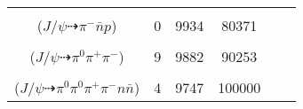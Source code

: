 \documentclass[landscape]{article}
\newcounter{rownumbers}
\newcommand\rn{\stepcounter{rownumbers}\arabic{rownumbers}}
\newcommand{\EOL}{\\} %
\newcommand{\topoTags}[1]{#1} %
\begin{document}
\begin{longtable}{clcccc}
\rn & \makecell[l]{ $ 
J/\psi \rightarrow \pi^{-} \bar{n} p 
$ \\ ($
J/\psi \dashrightarrow \pi^{-} \bar{n} p 
$) } & \topoTags{0 & }9934 & 80371 \EOL

\rn & \makecell[l]{ $ 
J/\psi \rightarrow \pi^{0} \rho^{0} ,
\rho^{0} \rightarrow \pi^{+} \pi^{-} 
$ \\ ($
J/\psi \dashrightarrow \pi^{0} \pi^{+} \pi^{-} 
$) } & \topoTags{9 & }9882 & 90253 \EOL

\rn & \makecell[l]{ $ 
J/\psi \rightarrow \bar{\Sigma}^{*+} \Sigma^{*-} ,
\bar{\Sigma}^{*+} \rightarrow \pi^{0} \bar{\Sigma}^{+} ,
\Sigma^{*-} \rightarrow \pi^{0} \Sigma^{-} ,
\bar{\Sigma}^{+} \rightarrow \pi^{+} \bar{n} ,
\Sigma^{-} \rightarrow \pi^{-} n 
$ \\ ($
J/\psi \dashrightarrow \pi^{0} \pi^{0} \pi^{+} \pi^{-} n \bar{n} 
$) } & \topoTags{4 & }9747 & 100000 \\ \hline

\end{longtable}
\end{document}
